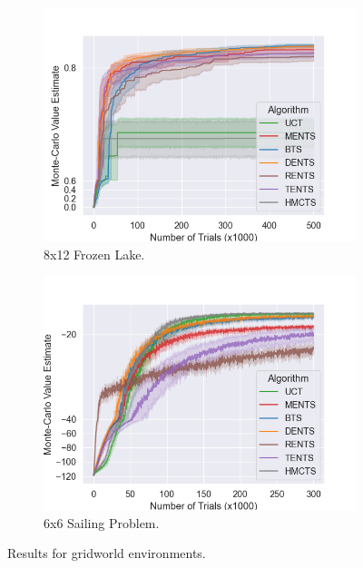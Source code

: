             \begin{figure}
                \centering
                \begin{subfigure}[b]{0.49\textwidth}
                    \centering
                    \includegraphics[width=\textwidth]{figures/temp/grid/fl.png}
                    \caption{8x12 Frozen Lake.}
                    \label{fig:fl}
                \end{subfigure}
                \begin{subfigure}[b]{0.49\textwidth}
                    \centering
                    \includegraphics[width=\textwidth]{figures/temp/grid/s.png}
                    \caption{6x6 Sailing Problem.}
                    \label{fig:sp}
                \end{subfigure}
                \caption{Results for gridworld environments.  }
                \label{fig:gridworld_results}
            \end{figure}





